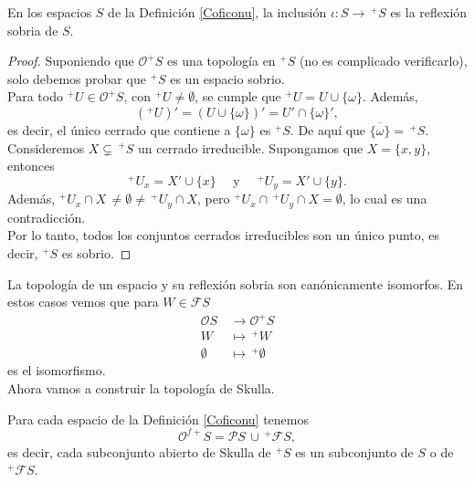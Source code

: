 \begin{lem}\label{Lema10.1.4}
    En  los espacios $S$ de la Definición \ref{Coficonu}, la inclusión $\iota\colon S\to \,^+S$ es la reflexión sobria de $S$.
\end{lem}

\begin{proof}
    Suponiendo que $\mathcal{O}^+S$ es una topología en $^+S$ (no es complicado verificarlo), solo debemos probar que $^+S$ es un espacio sobrio.\\

    Para todo $^+U\in \mathcal{O}^+S$, con $^+U\neq \emptyset$, se cumple que $^+U=U\cup \{\omega\}$. Además,
    \[
    (^+U)'=(U\cup \{\omega\})'=U'\cap \{\omega\}',
    \]
    es decir, el único cerrado que contiene a $\{\omega\}$ es $^+S$. De aquí que $\overline{\{\omega\}}=\,^+S$.\\

    Consideremos $X\subsetneq \,^+S$ un cerrado irreducible. Supongamos que $X=\{x, y\}$, entonces
    \[
    ^+U_x=X'\cup \{x\}\quad\mbox{ y }\quad ^+U_y=X'\cup \{y\}.
    \]
    Además, $^+U_x\cap X\,\neq \emptyset\neq\, ^+U_y\cap X$, pero $^+U_x\cap\, ^+U_y\cap X=\emptyset$, lo cual es una contradicción.\\

    Por lo tanto, todos los conjuntos cerrados irreducibles son un único punto, es decir, $^+S$ es sobrio.
\end{proof}

La topología de un espacio y su reflexión sobria son canónicamente isomorfos. En estos casos vemos que para $W\in \mathcal{F}S$
\[
\begin{split}
    \mathcal{O}S\,& \to \mathcal{O}^+S\\
    W\,&\mapsto\, ^+W\\
    \emptyset\,& \mapsto\,^+\emptyset
\end{split}
\]
es el isomorfismo.\\

Ahora vamos a construir la topología de Skulla.

\begin{lem}\label{Lema10.1.5}
    Para cada espacio de la Definición \ref{Coficonu} tenemos 
    \[
    \mathcal{O}^{f+}S=\mathcal{P}S\,\cup \,^+\mathcal{F}S,
    \]
    es decir, cada subconjunto abierto de Skulla de $^+S$ es un subconjunto de $S$ o de $^+\mathcal{F}S$.
\end{lem}

